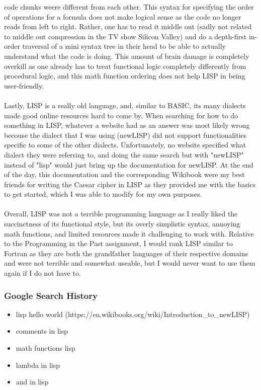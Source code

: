 \documentclass[letterpaper, 10pt, DIV=13]{scrartcl}
\numberwithin{equation}{section}
\numberwithin{figure}{section}
\numberwithin{table}{section}
\begin{document}
code chunks weere different from each other. This syntax for specifying the order of operations for a formula does not make logical sense as the code no 
longer reads from left to right. Rather, one has to read it middle out (sadly not related to middle out compression in the TV show Silicon Valley) and do a depth-first
in-order traversal of a mini syntax tree in their head to be able to actually understand what the code is doing. This amount of brain damage is completely overkill as
one already has to treat functional logic completely differently from procedural logic, and this math function ordering does not help LISP in being user-friendly.
\\ \\
Lastly, LISP is a really old language, and, similar to BASIC, its many dialects made good online resources hard to come by. When searching for how to do something in LISP, 
whatever a website had as an answer was most likely wrong becouse the dialect that I was using (newLISP) did not support functionalities specific to some of the 
other dialects. Unfortunately, no website specified what dialect they were referring to, and doing the same search but with "newLISP" instead of "lisp" would 
just bring up the documentation for newLISP. At the end of the day, this documentation and the corresponding Wikibook were my best friends for writing the Caesar cipher
in LISP as they provided me with the basics to get started, which I was able to modify for my own purposes.
\\ \\
Overall, LISP was not a terrible programming language as I really liked the succinctness of its functional style, but its overly simplistic syntax, annoying math 
functions, and limited resources made it challenging to work with. Relative to the Programming in the Past assignment, I would rank LISP similar to Fortran as they are 
both the grandfather languages of their respective domains and were not terrible and somewhat useable, but I would never want to use them again if I do not have to.

\subsubsection{Google Search History}
\begin{itemize}
    \item lisp hello world (https://en.wikibooks.org/wiki/Introduction\_to\_newLISP)
    \item comments in lisp
    \item math functions lisp
    \item lambda in lisp
    \item and in lisp
\end{itemize}
\end{document}
